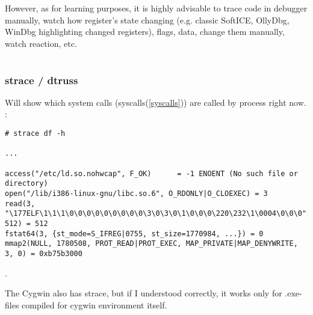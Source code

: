 {However, as for learning purposes, it is highly advisable to trace code in debugger manually, watch how register's state
changing (e.g. classic SoftICE, OllyDbg, WinDbg highlighting changed registers), flags, data, change them
manually, watch reaction, etc.}

\section{}

\label{strace}
\subsubsection{strace / dtruss}

{Will show which system calls (syscalls(\ref{syscalls})) are called by process right now}.
:

\begin{lstlisting}
# strace df -h

...

access("/etc/ld.so.nohwcap", F_OK)      = -1 ENOENT (No such file or directory)
open("/lib/i386-linux-gnu/libc.so.6", O_RDONLY|O_CLOEXEC) = 3
read(3, "\177ELF\1\1\1\0\0\0\0\0\0\0\0\0\3\0\3\0\1\0\0\0\220\232\1\0004\0\0\0"..., 512) = 512
fstat64(3, {st_mode=S_IFREG|0755, st_size=1770984, ...}) = 0
mmap2(NULL, 1780508, PROT_READ|PROT_EXEC, MAP_PRIVATE|MAP_DENYWRITE, 3, 0) = 0xb75b3000
\end{lstlisting}

.

{The Cygwin also has strace, but if I understood correctly, it works only for .exe-files
compiled for cygwin environment itself}.

\section{}

